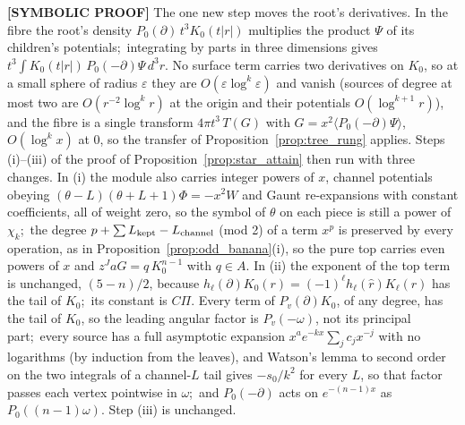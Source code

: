 \documentclass[aps,pra,twocolumn,superscriptaddress,longbibliography]{revtex4-2}
\begin{document}
\textbf{[SYMBOLIC PROOF]} The one new step moves the root's derivatives.  In
the fibre the root's density $P_0(\partial)\,t^3K_0(t|r|)$ multiplies the
product $\Psi$ of its children's potentials;\ integrating by parts in three
dimensions gives $t^3\int K_0(t|r|)\,P_0(-\partial)\Psi\,d^3r$.  No surface term
carries two derivatives on $K_0$, so at a small sphere of radius $\varepsilon$
they are $O(\varepsilon\log^k\varepsilon)$ and vanish (sources of degree at most
two are $O(r^{-2}\log^kr)$ at the origin and their potentials $O(\log^{k+1}r)$),
and the fibre is a single transform $4\pi t^3\,T(G)$ with
$G=x^2\langle P_0(-\partial)\Psi\rangle$, $O(\log^kx)$ at $0$, so the transfer of
Proposition~\ref{prop:tree_rung} applies.  Steps (i)--(iii) of the proof of
Proposition~\ref{prop:star_attain} then run with three changes.  In (i) the
module also carries integer powers of $x$, channel potentials obeying
$(\theta-L)(\theta+L+1)\Phi=-x^2W$ and Gaunt re-expansions with constant
coefficients, all of weight zero, so the symbol of $\theta$ on each piece is
still a power of $\chi_k$;\ the degree $p+\sum L_{\rm kept}-L_{\rm channel}$
(mod 2) of a term $x^p$ is preserved by every operation, as in
Proposition~\ref{prop:odd_banana}(i), so the pure top carries even powers of
$x$ and $z^JaG=q\,K_0^{n-1}$ with $q\in A$.  In (ii) the exponent of the top
term is unchanged, $(5-n)/2$, because $h_\ell(\partial)K_0(r)=(-1)^\ell
h_\ell(\hat r)K_\ell(r)$ has the tail of $K_0$;\ its constant is $C\Pi$.  Every term of
$P_v(\partial)K_0$, of any degree, has the tail of $K_0$, so the leading angular factor is
$P_v(-\omega)$, not its principal part;\ every source has a full asymptotic expansion
$x^ae^{-kx}\sum_jc_jx^{-j}$ with no logarithms (by induction from the leaves), and Watson's
lemma to second order on the two integrals of a channel-$L$ tail gives $-s_0/k^2$ for every
$L$, so that factor passes each vertex pointwise in $\omega$;\ and $P_0(-\partial)$ acts on
$e^{-(n-1)x}$ as $P_0((n-1)\omega)$.  Step (iii) is unchanged.
\end{document}
